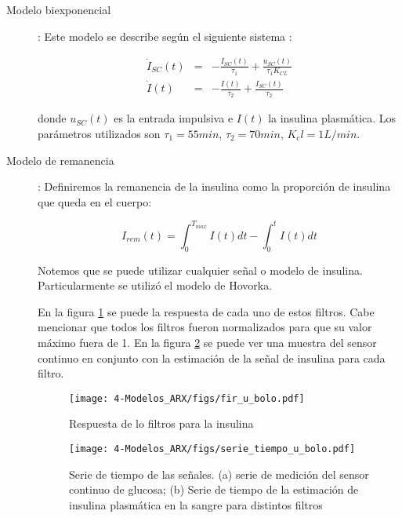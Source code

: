 \begin{description}
\begin{description}
	\item [Modelo biexponencial]: Este modelo se describe según el siguiente sistema \cite{bondia2018insulin}:
	
	\begin{eqnarray}
		\dot{I}_{SC}(t) & = & - \frac{I_{SC}(t)}{\tau_1} + \frac{u_{SC}(t)}{\tau_1K_{CL}} \\
		\dot{I}(t) & = & - \frac{I(t)}{\tau_2} + \frac{I_{SC}(t)}{\tau_2}
	\end{eqnarray}

	donde $u_{SC}(t)$ es la entrada impulsiva e $I(t)$ la insulina plasmática. Los parámetros utilizados son $\tau_1 = 55 min$, $\tau_2 = 70 min$, $K_cl = 1 L/min$.

	\item[Modelo de remanencia]: Definiremos la remanencia de la insulina como la proporción de insulina que queda en el cuerpo:
	
	\begin{equation}
		I_{rem}(t) = \int_{0}^{T_{max}} I(t) dt - \int_{0}^{t} I(t) dt
	\end{equation}
	
	Notemos que se puede utilizar cualquier señal o modelo de insulina. Particularmente se utilizó el modelo de Hovorka.



En la figura \ref{fig:fir_u_bolo} se puede la respuesta de cada uno de estos filtros. Cabe mencionar que todos los filtros fueron normalizados para que su valor máximo fuera de 1. En la figura \ref{fig:serie_tiempo_u_bolo} se puede ver una muestra del sensor continuo en conjunto con la estimación de la señal de insulina para cada filtro.

\begin{figure}[H]
	\centering
	\texttt{[image: 4-Modelos\_ARX/figs/fir\_u\_bolo.pdf]}
	\caption{Respuesta de lo filtros para la insulina}
	\label{fig:fir_u_bolo}
\end{figure}

\begin{figure}[H]
	\centering
	\texttt{[image: 4-Modelos\_ARX/figs/serie\_tiempo\_u\_bolo.pdf]}
	\caption{Serie de tiempo de las señales. (a) serie de medición del sensor continuo de glucosa; (b) Serie de tiempo de la estimación de insulina plasmática en la sangre para distintos filtros}
	\label{fig:serie_tiempo_u_bolo}
\end{figure}

\end{description}


\end{description}
